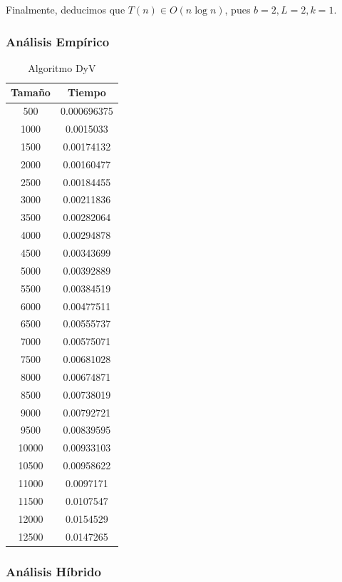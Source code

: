 \documentclass[a4paper,12pt,twoside]{article} %
\begin{document}
Finalmente, deducimos que $T(n) \in O(n \log{n})$, pues $b=2, L=2, k=1$.
\newpage

\subsubsection{Análisis Empírico}

\begin{table}[h]
	\begin{center}
		\begin{tabular}{|c|c|}
		\hline
		Tamaño & Tiempo \\
		\hline
		500 & 0.000696375 \\
		1000 & 0.0015033 \\
		1500 & 0.00174132 \\
		2000 & 0.00160477 \\
		2500 & 0.00184455 \\
		3000 & 0.00211836 \\
		3500 & 0.00282064 \\
		4000 & 0.00294878 \\
		4500 & 0.00343699 \\
		5000 & 0.00392889 \\
		5500 & 0.00384519 \\
		6000 & 0.00477511 \\
		6500 & 0.00555737 \\
		7000 & 0.00575071 \\
		7500 & 0.00681028 \\
		8000 & 0.00674871 \\
		8500 & 0.00738019 \\
		9000 & 0.00792721 \\
		9500 & 0.00839595 \\
		10000 & 0.00933103 \\
		10500 & 0.00958622 \\ 
		11000 & 0.0097171 \\
		11500 & 0.0107547 \\
		12000 & 0.0154529 \\
		12500 & 0.0147265 \\
		\hline
		\end{tabular}
	\end{center}
	\caption{Algoritmo DyV}
\end{table}

\newpage

\subsubsection{Análisis Híbrido}
\end{document}
